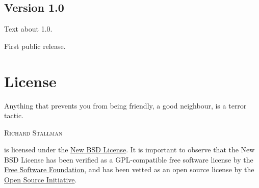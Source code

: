 \documentclass[a4paper,twoside,12pt]{memoir}
\begin{document}
%
%

\section*{Version 1.0}

Text about 1.0.

\begin{changelog}\small
\newfeature First public release.
\end{changelog}

%
%

\chapter*{License}
\label{chap:license}

\epigraph{Anything that prevents you from being friendly, a good neighbour, is a terror tactic.}{\textsc{Richard Stallman}}

\noindent\arara is licensed under the \href{http://www.opensource.org/licenses/bsd-license.php}{New BSD License}. It is important to observe that the New BSD License has been verified as a GPL-compatible free software license by the \href{http://www.fsf.org/}{Free Software Foundation}, and has been vetted as an open source license by the \href{http://www.opensource.org/}{Open Source Initiative}.
\end{document}
